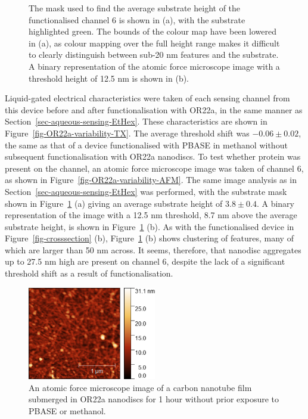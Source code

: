 \documentclass[
  a4paper,
]{scrbook}
\begin{document}
\begin{figure}
\begin{minipage}[t]{0.01\linewidth}
{}

\end{minipage}%

\caption{\label{fig-OR22a-variability-AFM-comparison}The mask used to
find the average substrate height of the functionalised channel 6 is
shown in (a), with the substrate highlighted green. The bounds of the
colour map have been lowered in (a), as colour mapping over the full
height range makes it difficult to clearly distinguish between sub-20 nm
features and the substrate. A binary representation of the atomic force
microscope image with a threshold height of 12.5 nm is shown in (b).}

\end{figure}

Liquid-gated electrical characteristics were taken of each sensing
channel from this device before and after functionalisation with OR22a,
in the same manner as Section~\ref{sec-aqueous-sensing-EtHex}. These
characteristics are shown in Figure~\ref{fig-OR22a-variability-TX}. The
average threshold shift was \(-0.06\pm0.02\), the same as that of a
device functionalised with PBASE in methanol without subsequent
functionalisation with OR22a nanodiscs. To test whether protein was
present on the channel, an atomic force microscope image was taken of
channel 6, as shown in Figure~\ref{fig-OR22a-variability-AFM}. The same
image analysis as in Section~\ref{sec-aqueous-sensing-EtHex} was
performed, with the substrate mask shown in
Figure~\ref{fig-OR22a-variability-AFM-comparison} (a) giving an average
substrate height of \(3.8\pm0.4\). A binary representation of the image
with a 12.5 nm threshold, 8.7 nm above the average substrate height, is
shown in Figure~\ref{fig-OR22a-variability-AFM-comparison} (b). As with
the functionalised device in Figure~\ref{fig-crosssection} (b),
Figure~\ref{fig-OR22a-variability-AFM-comparison} (b) shows clustering
of features, many of which are larger than 50 nm across. It seems,
therefore, that nanodisc aggregates up to 27.5 nm high are present on
channel 6, despite the lack of a significant threshold shift as a result
of functionalisation.

\begin{figure}

{\centering \includegraphics[width=0.5\textwidth,height=\textheight]{figures/ch8/00161_noPBASE.png}

}

\caption{\label{fig-OR22a-noPBASE-AFM}An atomic force microscope image
of a carbon nanotube film submerged in OR22a nanodiscs for 1 hour
without prior exposure to PBASE or methanol.}

\end{figure}
\end{document}
